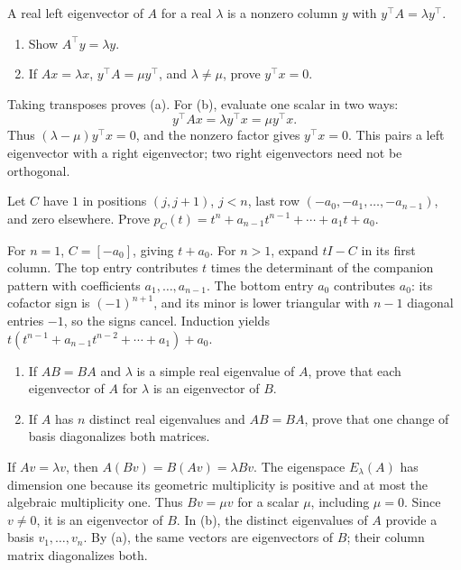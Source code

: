 \begin{problem}\label{ex:08:left}
A real left eigenvector of \(A\) for a real \(\lambda\) is a nonzero
column \(y\) with \(y^\top A=\lambda y^\top\).
\begin{enumerate}
\item Show \(A^\top y=\lambda y\).
\item If \(Ax=\lambda x\), \(y^\top A=\mu y^\top\), and
\(\lambda\ne\mu\), prove \(y^\top x=0\).
\end{enumerate}
\end{problem}
\begin{solution}
Taking transposes proves (a). For (b), evaluate one scalar in two ways:
\[
 y^\top Ax=\lambda y^\top x=\mu y^\top x.
\]
Thus \((\lambda-\mu)y^\top x=0\), and the nonzero factor gives
\(y^\top x=0\).
This pairs a left eigenvector with a right eigenvector; two right
eigenvectors need not be orthogonal.
\end{solution}

\begin{problem}\label{ex:08:companion}
Let \(C\) have \(1\) in positions \((j,j+1)\), \(j<n\), last row
\((-a_0,-a_1,\ldots,-a_{n-1})\), and zero elsewhere.
Prove \(p_C(t)=t^n+a_{n-1}t^{n-1}+\cdots+a_1t+a_0\).
\end{problem}
\begin{solution}
For \(n=1\), \(C=[-a_0]\), giving \(t+a_0\).
For \(n>1\), expand \(tI-C\) in its first column.
The top entry contributes \(t\) times the determinant of the companion
pattern with coefficients \(a_1,\ldots,a_{n-1}\).
The bottom entry \(a_0\) contributes \(a_0\):
its cofactor sign is \((-1)^{n+1}\), and its minor is lower triangular
with \(n-1\) diagonal entries \(-1\), so the signs cancel.
Induction yields
\(t(t^{n-1}+a_{n-1}t^{n-2}+\cdots+a_1)+a_0\).
\end{solution}

\begin{problem}\label{ex:08:commuting-simple}
\begin{enumerate}
\item If \(AB=BA\) and \(\lambda\) is a simple real eigenvalue of \(A\),
prove that each eigenvector of \(A\) for \(\lambda\) is an eigenvector of \(B\).
\item If \(A\) has \(n\) distinct real eigenvalues and \(AB=BA\), prove that
one change of basis diagonalizes both matrices.
\end{enumerate}
\end{problem}
\begin{solution}
If \(Av=\lambda v\), then \(A(Bv)=B(Av)=\lambda Bv\).
The eigenspace \(E_\lambda(A)\) has dimension one because its geometric
multiplicity is positive and at most the algebraic multiplicity one.
Thus \(Bv=\mu v\) for a scalar \(\mu\), including \(\mu=0\).
Since \(v\ne0\), it is an eigenvector of \(B\).
In (b), the distinct eigenvalues of \(A\) provide a basis \(v_1,\ldots,v_n\).
By (a), the same vectors are eigenvectors of \(B\); their column matrix
diagonalizes both.
\end{solution}

